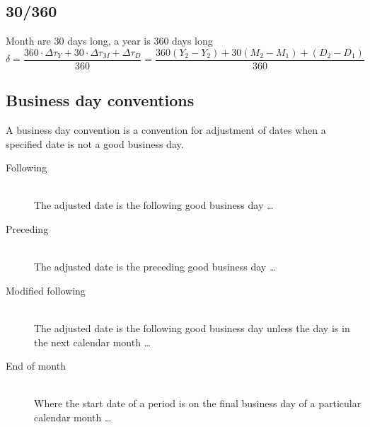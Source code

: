 \documentclass[11pt,a4paper]{article}
\numberwithin{equation}{section}
\begin{document}
\subsection{30/360}
Month are 30 days long, a year is 360 days long
\[
\delta = \frac{360 \cdot \Delta \tau_Y + 30 \cdot \Delta \tau_M + \Delta \tau_D}{360} =\frac{360(Y_2-Y_2)+30(M_2-M_1)+(D_2-D_1)}{360}
\]

\subsection{Business day conventions}
A business day convention is a convention for adjustment of dates when a specified date is not a good business day. 
\begin{description}
  \item[Following] \hfill \\
The adjusted date is the following good business day \ldots
  \item[Preceding] \hfill \\
    The adjusted date is the preceding good business day \ldots
  \item[Modified following] \hfill \\
  The adjusted date is the following good business day unless the day is in the next calendar month \ldots
  \item[End of month] \hfill \\
Where the start date of a period is on the final business day of a particular calendar month \ldots
\end{description}

\newpage



\end{document}
